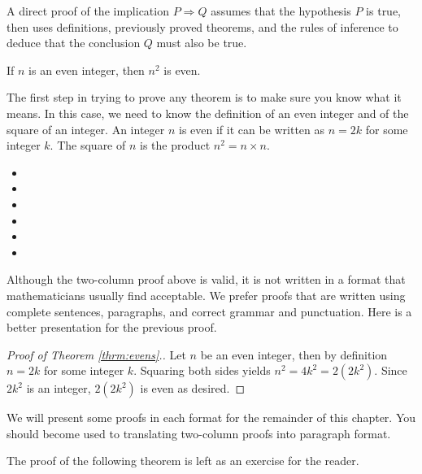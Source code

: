 A direct proof of the implication $P\Rightarrow Q$ assumes that the hypothesis $P$ is true, then uses definitions, previously proved theorems, and the rules of inference to deduce that the conclusion $Q$ must also be true. 

\begin{thrm}\label{thrm:evens}
If $n$ is an even integer, then $n^2$ is even.
\end{thrm}

The first step in trying to prove any theorem is to make sure you know what it means. In this case, we need to know the definition of an even integer and of the square of an integer. An integer $n$ is even if it can be written as $n=2k$ for some integer $k$. The square of $n$ is the product $n^2=n\times n$.

\begin{itemize}\itemsep0pt\itemindent-2em
\item[]
\item[]
\item[]
\item[]
\item[]
\item[]
\end{itemize}

Although the two-column proof above is valid, it is not written in a format that mathematicians usually find acceptable. We prefer proofs that are written using complete sentences, paragraphs, and correct grammar and punctuation. Here is a better presentation for the previous proof. 

\begin{proof}[Proof of Theorem \ref{thrm:evens}.]
Let $n$ be an even integer, then by definition $n=2k$ for some integer $k$.  Squaring both sides yields $n^2=4k^2=2(2k^2)$.  Since $2k^2$ is an integer, $2(2k^2)$ is even as desired.
\end{proof}

We will present some proofs in each format for the remainder of this chapter. You should become used to translating two-column  proofs into paragraph format.

The proof of the following theorem is left as an exercise for the reader.

